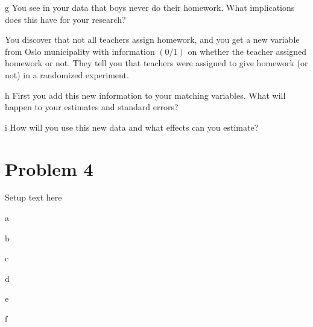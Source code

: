 \documentclass{article}
\begin{document}
\begin{problem}{g}
You see in your data that boys never do their homework. What implications does this have for your research?
\end{problem}
\begin{solution}
\end{solution}

You discover that not all teachers assign homework, and you get a new variable from Oslo municipality with information $(0 / 1)$ on whether the teacher assigned homework or not. They tell you that teachers were assigned to give homework (or not) in a randomized experiment.
\begin{problem}{h}
First you add this new information to your matching variables. What will happen to your estimates and standard errors?
\end{problem}
\begin{solution}
\end{solution}


\begin{problem}{i}
How will you use this new data and what effects can you estimate?
\end{problem}
\begin{solution}
\end{solution}


\newpage
\section*{Problem 4}
Setup text here

\begin{problem}{a}
\end{problem}
\begin{solution}
\end{solution}

\begin{problem}{b}
\end{problem}
\begin{solution}
\end{solution}

\begin{problem}{c}
\end{problem}
\begin{solution}
\end{solution}

\begin{problem}{d}
\end{problem}
\begin{solution}
\end{solution}

\begin{problem}{e}
\end{problem}
\begin{solution}
\end{solution}

\begin{problem}{f}
\end{problem}
\begin{solution}
\end{solution}
\end{document}
